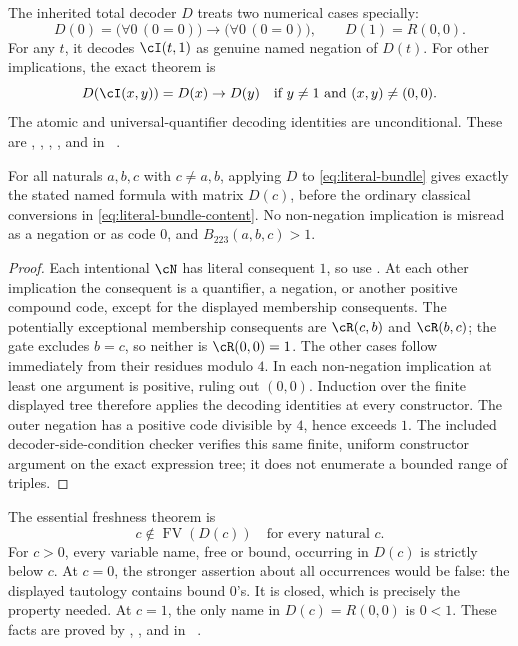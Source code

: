 The inherited total decoder $D$ treats two numerical cases specially:
\[
 D(0)=\bigl(\forall 0\,(0=0)\bigr)
              \to\bigl(\forall 0\,(0=0)\bigr),
 \qquad D(1)=R(0,0).
\]
For any $t$, it decodes $\cI(t,1)$ as genuine named negation of $D(t)$.
For other implications, the exact theorem is
\[
 D(\cI(x,y))=D(x)\to D(y)
 \quad\text{if }y\ne1\text{ and }(x,y)\ne(0,0).
\]
The atomic and universal-quantifier decoding identities are unconditional.
These are , , , ,
 and  in ~\cite{kdecode}.

\begin{lemma}
\label{lem:ks-decode-interface}
For all naturals $a,b,c$ with $c\ne a,b$, applying $D$ to
\eqref{eq:literal-bundle} gives exactly the stated named formula with
matrix $D(c)$, before the ordinary classical conversions in
\eqref{eq:literal-bundle-content}.  No non-negation implication is
misread as a negation or as code $0$, and $B_{223}(a,b,c)>1$.
\end{lemma}

\begin{proof}
Each intentional $\cN$ has literal consequent $1$, so use .
At each other implication the consequent is a quantifier, a negation,
or another positive compound code, except for the displayed membership
consequents.  The potentially exceptional membership consequents are
$\cR(c,b)$ and $\cR(b,c)$; the gate excludes $b=c$, so neither is
$\cR(0,0)=1$.  The other cases follow immediately from their residues
modulo $4$.  In each non-negation implication at least one argument is
positive, ruling out $(0,0)$.  Induction over the finite displayed tree
therefore applies the decoding identities at every constructor.
The outer negation has a positive code divisible by $4$, hence exceeds
$1$.  The included decoder-side-condition checker verifies this same
finite, uniform constructor argument on the exact expression tree; it
does not enumerate a bounded range of triples.
\end{proof}

The essential freshness theorem is
\begin{equation}
             c\notin\operatorname{FV}(D(c))
             \quad\text{for every natural }c.
 \label{eq:private-freshness}
\end{equation}
For $c>0$, every variable name, free or bound, occurring in $D(c)$ is
strictly below $c$.  At $c=0$, the stronger assertion about all occurrences
would be false: the displayed tautology contains bound $0$'s.  It is
closed, which is precisely the property needed.  At $c=1$, the only name
in $D(c)=R(0,0)$ is $0<1$.  These facts are proved by
, ,  and
 in ~\cite{kdecode}.

